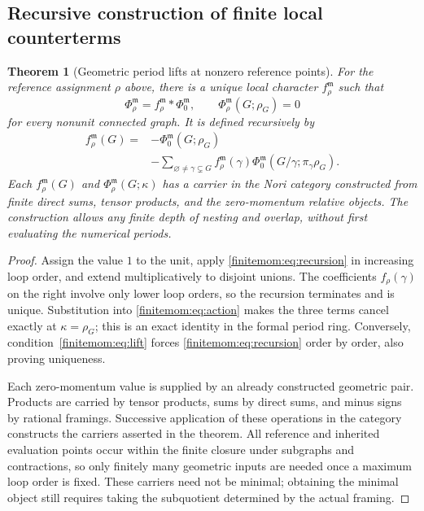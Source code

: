 \documentclass[11pt,a4paper,oneside]{article}
\theoremstyle{plain}
\newtheorem{theorem}{Theorem}[section]
\theoremstyle{definition}
\theoremstyle{remark}
\numberwithin{equation}{section}
\begin{document}
\subsection{Recursive construction of finite local counterterms}
\begin{theorem}[Geometric period lifts at nonzero reference points]\label{finitemom:thm:construction}
For the reference assignment $\rho$ above, there is a unique local character $f_\rho^{\mathfrak m}$ such that
\begin{equation}\label{finitemom:eq:lift}
 \Phi_\rho^{\mathfrak m}=f_\rho^{\mathfrak m}*\Phi_0^{\mathfrak m},
 \qquad \Phi_\rho^{\mathfrak m}(G;\rho_G)=0
\end{equation}
for every nonunit connected graph. It is defined recursively by
\begin{align}\label{finitemom:eq:recursion}
 f_\rho^{\mathfrak m}(G)={}&-\Phi_0^{\mathfrak m}(G;\rho_G)\nonumber\\
 &-\sum_{\varnothing\ne\gamma\subsetneq G}
 f_\rho^{\mathfrak m}(\gamma)
 \Phi_0^{\mathfrak m}(G/\gamma;\pi_\gamma\rho_G).
\end{align}
Each $f_\rho^{\mathfrak m}(G)$ and $\Phi_\rho^{\mathfrak m}(G;\kappa)$ has a carrier in the Nori category constructed from finite direct sums, tensor products, and the zero-momentum relative objects.
The construction allows any finite depth of nesting and overlap, without first evaluating the numerical periods.
\end{theorem}
\begin{proof}
Assign the value $1$ to the unit, apply \eqref{finitemom:eq:recursion} in increasing loop order, and extend multiplicatively to disjoint unions.
The coefficients $f_\rho(\gamma)$ on the right involve only lower loop orders, so the recursion terminates and is unique.
Substitution into \eqref{finitemom:eq:action} makes the three terms cancel exactly at $\kappa=\rho_G$; this is an exact identity in the formal period ring.
Conversely, condition~\eqref{finitemom:eq:lift} forces \eqref{finitemom:eq:recursion} order by order, also proving uniqueness.

Each zero-momentum value is supplied by an already constructed geometric pair.
Products are carried by tensor products, sums by direct sums, and minus signs by rational framings.
Successive application of these operations in the category constructs the carriers asserted in the theorem.
All reference and inherited evaluation points occur within the finite closure under subgraphs and contractions, so only finitely many geometric inputs are needed once a maximum loop order is fixed.
These carriers need not be minimal; obtaining the minimal object still requires taking the subquotient determined by the actual framing.
\end{proof}
\end{document}
